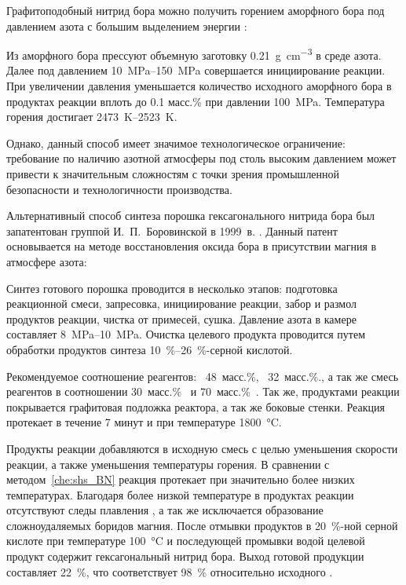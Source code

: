 Графитоподобный нитрид бора можно получить горением аморфного бора под давлением 
азота с большим выделением энергии \cite[]{loryan_nanosized_2009}:


Из аморфного бора прессуют объемную заготовку \SI{0.21}{\gram\per\cm^3} в среде
азота. Далее под давлением \SIrange{10}{150}{\mega\pascal} совершается
инициирование реакции. При увеличении давления   уменьшается количество
исходного аморфного бора в продуктах реакции вплоть до 0.1 масс.\% при давлении 
\SI{100}{\mega\pascal}. Температура горения достигает \SIrange{2473}{2523}{\kelvin}.

Однако, данный способ имеет значимое технологическое ограничение: требование 
по наличию азотной атмосферы под столь высоким давлением может привести к значительным сложностям
с точки зрения промышленной безопасности и технологичности производства.

Альтернативный способ синтеза порошка гексагонального нитрида бора был запатентован 
группой И.~П.~Боровинской в 1999~в. \cite[]{__1999}. Данный патент основывается на 
методе восстановления оксида бора в присутствии магния
в атмосфере азота:


Синтез готового порошка проводится в несколько этапов: подготовка реакционной смеси,
запресовка, инициирование реакции, забор и размол продуктов реакции, чистка от примесей,
сушка. Давление азота в камере составляет \SIrange{8}{10}{\mega\pascal}. Очистка 
целевого продукта проводится путем обработки продуктов синтеза 
\SIrange{10}{26}{\%}-серной кислотой.  

Рекомендуемое соотношение реагентов: ~48~масс.\%, ~32~масс.\%., 
а так же смесь реагентов в соотношении 30~масс.\%~ и 
70~масс.\%~. Так же, продуктами реакции покрывается графитовая подложка
реактора, а так же боковые стенки. Реакция протекает в течение 7 минут и при
температуре \SI{1800}{\degreeCelsius}.  

Продукты реакции добавляются в исходную смесь с целью уменьшения скорости реакции, 
а также уменьшения температуры горения. В сравнении с методом~\ref{che:shs_BN} 
реакция протекает при значительно более низких температурах. Благодаря более низкой
температуре в продуктах реакции отсутствуют следы плавления , а так же 
исключается образование сложноудаляемых боридов магния. После отмывки продуктов
в \SI{20}{\%}-ной серной кислоте при температуре \SI{100}{\degreeCelsius}
и последующей промывки водой целевой продукт содержит гексагональный нитрид бора.
Выход готовой продукции составляет \SI{22}{\%}, что соответствует \SI{98}{\%}  
относительно исходного . 

